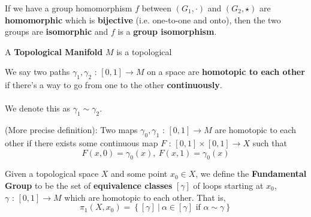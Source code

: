 \documentclass[11pt]{article}
\begin{document}
\begin{bluebox}
    \begin{definition}
        If we have a group homomorphism $f$ between $(G_1, \cdot)$ and $(G_2, \star)$ are \textbf{homomorphic} which is \textbf{bijective} (i.e. one-to-one and onto), then the two groups are \textbf{isomorphic} and $f$ is a \textbf{group isomorphism}.
    \end{definition}
\end{bluebox}


\begin{bluebox}
    \begin{definition}
        A \textbf{Topological Manifold} $M$ is a topological 
    \end{definition}
\end{bluebox}

\begin{redbox}
    \begin{definition}
        We say two paths $\gamma_1, \gamma_2 \text{ : } [0, 1] \rightarrow M $ on a space are \textbf{homotopic to each other} if there's a way to go from one to the other \textbf{continuously}. 
        \\
        \\
        We denote this as $\gamma_1 \sim \gamma_2$.
    \end{definition}
\end{redbox}

\begin{bluebox}
    \begin{definition}
        (More precise definition): Two maps $\gamma_0, \gamma_1 \text{ : } [0, 1] \rightarrow M$ are homotopic to each other if there exists some continuous map $F \text{ : } [0, 1] \times [0, 1] \rightarrow X $ such that $$ F(x, 0) = \gamma_0(x),~F(x, 1) = \gamma_0(x)  $$ 
    \end{definition}
\end{bluebox}

\begin{bluebox}
    \begin{definition}
        Given a topological space $X$ and some point $x_0 \in X$, we define the \textbf{Fundamental Group} to be the set of \textbf{equivalence classes} $[\gamma]$ of loops starting at $x_0$, $\gamma \text{ : } [0, 1] \rightarrow M$ which are homotopic to each other. That is, $$ \pi_1(X, x_0) = \left\{ [\gamma] ~|~ \alpha \in [\gamma] \text{ if } \alpha \sim \gamma \right\}$$
    \end{definition}
\end{bluebox}





\newpage
\vskip 0.5cm
\end{document}
